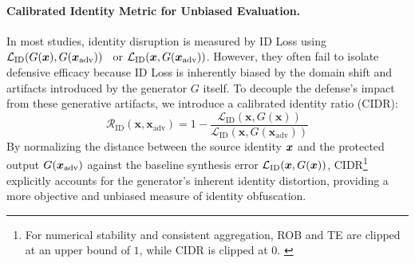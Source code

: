 \documentclass{article}
\begin{document}
\paragraph{Calibrated Identity Metric for Unbiased Evaluation.}
In most studies, identity disruption is measured by ID Loss using ${\mathcal{L}}_{\mathrm{ID}}(G({\bm{x}}), G({\bm{x}}_{\mathrm{adv}}))$~\cite{van2023anti, shim2025leat, wang2025nullswap, lee2025scol} or ${\mathcal{L}}_{\mathrm{ID}}({\bm{x}}, G({\bm{x}}_{\mathrm{adv}}))$. However, they often fail to isolate defensive efficacy because ID Loss is inherently biased by the domain shift and artifacts introduced by the generator $G$ itself.
To decouple the defense's impact from these generative artifacts, we introduce a calibrated identity ratio (CIDR):
\begin{equation}
\label{eq:rel_idloss}
\mathcal{R}_{\mathrm{ID}}(\mathbf{x}, \mathbf{x}_{\mathrm{adv}})
= 1 - \frac{\mathcal{L}_{\mathrm{ID}}(\mathbf{x}, G(\mathbf{x}))}
{\mathcal{L}_{\mathrm{ID}}(\mathbf{x}, G(\mathbf{x}_{\mathrm{adv}}))} 
\end{equation}
By normalizing the distance between the source identity ${\bm{x}}$ and the protected output $G({\bm{x}}_{\mathrm{adv}})$ against the baseline synthesis error ${\mathcal{L}}_{\mathrm{ID}}({\bm{x}}, G({\bm{x}}))$, CIDR\footnote{For numerical stability and consistent aggregation, ROB and TE are clipped at an upper bound of $1$, while CIDR is clipped at $0$. \label{setting}} explicitly accounts for the generator’s inherent identity distortion, providing a more objective and unbiased measure of identity obfuscation. 

\end{document}
